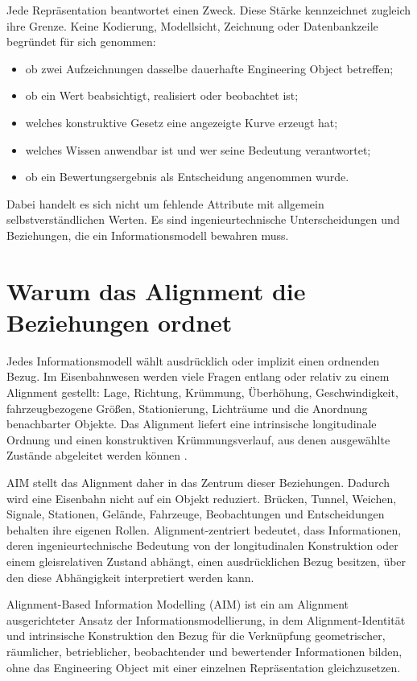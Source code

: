 Jede Repräsentation beantwortet einen Zweck. Diese Stärke kennzeichnet zugleich
ihre Grenze. Keine Kodierung, Modellsicht, Zeichnung oder Datenbankzeile
begründet für sich genommen:

\begin{itemize}
\item ob zwei Aufzeichnungen dasselbe dauerhafte Engineering Object betreffen;
\item ob ein Wert beabsichtigt, realisiert oder beobachtet ist;
\item welches konstruktive Gesetz eine angezeigte Kurve erzeugt hat;
\item welches Wissen anwendbar ist und wer seine Bedeutung verantwortet;
\item ob ein Bewertungsergebnis als Entscheidung angenommen wurde.
\end{itemize}

Dabei handelt es sich nicht um fehlende Attribute mit allgemein
selbstverständlichen Werten. Es sind ingenieurtechnische Unterscheidungen und
Beziehungen, die ein Informationsmodell bewahren muss.

\section{Warum das Alignment die Beziehungen ordnet}

Jedes Informationsmodell wählt ausdrücklich oder implizit einen ordnenden
Bezug. Im Eisenbahnwesen werden viele Fragen entlang oder relativ zu einem
Alignment gestellt: Lage, Richtung, Krümmung, Überhöhung, Geschwindigkeit,
fahrzeugbezogene Größen, Stationierung, Lichträume und die Anordnung
benachbarter Objekte. Das Alignment liefert eine intrinsische longitudinale
Ordnung und einen konstruktiven Krümmungsverlauf, aus denen ausgewählte
Zustände abgeleitet werden können
\cite{Kufver1997MathematicalDescription,Kufver2000RailwayAlignment}.

AIM stellt das Alignment daher in das Zentrum dieser Beziehungen. Dadurch wird
eine Eisenbahn nicht auf ein Objekt reduziert. Brücken, Tunnel, Weichen,
Signale, Stationen, Gelände, Fahrzeuge, Beobachtungen und Entscheidungen
behalten ihre eigenen Rollen. Alignment-zentriert bedeutet, dass Informationen,
deren ingenieurtechnische Bedeutung von der longitudinalen Konstruktion oder
einem gleisrelativen Zustand abhängt, einen ausdrücklichen Bezug besitzen, über
den diese Abhängigkeit interpretiert werden kann.

\begin{definition}
Alignment-Based Information Modelling (AIM) ist ein am Alignment
ausgerichteter Ansatz der Informationsmodellierung, in dem
Alignment-Identität und intrinsische Konstruktion den Bezug für die
Verknüpfung geometrischer, räumlicher, betrieblicher, beobachtender und
bewertender Informationen bilden, ohne das Engineering Object mit einer
einzelnen Repräsentation gleichzusetzen.
\end{definition}

